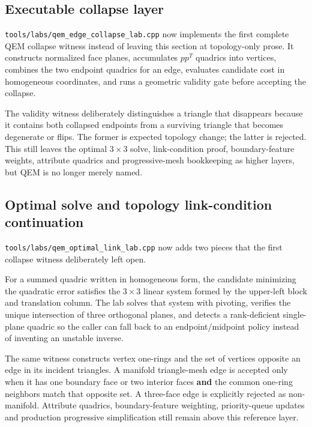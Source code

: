 \subsection{Executable collapse layer}\label{appendix-89db9fe1bc8a-executable-collapse-layer}

\texttt{tools/labs/qem\_edge\_collapse\_lab.cpp} now implements the first complete QEM collapse witness instead of leaving this section at topology-only prose. It constructs normalized face planes, accumulates \(pp^T\) quadrics into vertices, combines the two endpoint quadrics for an edge, evaluates candidate cost in homogeneous coordinates, and runs a geometric validity gate before accepting the collapse.

The validity witness deliberately distinguishes a triangle that disappears because it contains both collapsed endpoints from a surviving triangle that becomes degenerate or flips. The former is expected topology change; the latter is rejected. This still leaves the optimal \(3\times3\) solve, link-condition proof, boundary-feature weights, attribute quadrics and progressive-mesh bookkeeping as higher layers, but QEM is no longer merely named.

\subsection{Optimal solve and topology link-condition continuation}\label{appendix-89db9fe1bc8a-optimal-solve-and-topology-link-condition-continuation}

\texttt{tools/labs/qem\_optimal\_link\_lab.cpp} now adds two pieces that the first collapse witness deliberately left open.

For a summed quadric written in homogeneous form, the candidate minimizing the quadratic error satisfies the \(3\times3\) linear system formed by the upper-left block and translation column. The lab solves that system with pivoting, verifies the unique intersection of three orthogonal planes, and detects a rank-deficient single-plane quadric so the caller can fall back to an endpoint/midpoint policy instead of inventing an unstable inverse.

The same witness constructs vertex one-rings and the set of vertices opposite an edge in its incident triangles. A manifold triangle-mesh edge is accepted only when it has one boundary face or two interior faces \textbf{and} the common one-ring neighbors match that opposite set. A three-face edge is explicitly rejected as non-manifold. Attribute quadrics, boundary-feature weighting, priority-queue updates and production progressive simplification still remain above this reference layer.
